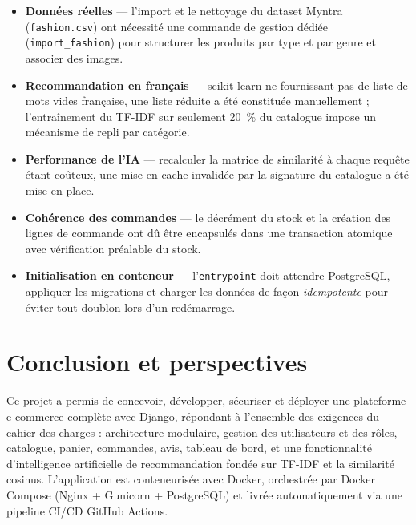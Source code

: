 \documentclass[11pt,a4paper]{report}
\begin{document}
\begin{itemize}[leftmargin=1.4em]
  \item \textbf{Données réelles} — l'import et le nettoyage du dataset Myntra
        (\texttt{fashion.csv}) ont nécessité une commande de gestion dédiée
        (\texttt{import\_fashion}) pour structurer les produits par type et par
        genre et associer des images.
  \item \textbf{Recommandation en français} — scikit-learn ne fournissant pas de
        liste de mots vides française, une liste réduite a été constituée
        manuellement ; l'entraînement du TF-IDF sur seulement 20~\% du catalogue
        impose un mécanisme de repli par catégorie.
  \item \textbf{Performance de l'IA} — recalculer la matrice de similarité à chaque
        requête étant coûteux, une mise en cache invalidée par la signature du
        catalogue a été mise en place.
  \item \textbf{Cohérence des commandes} — le décrément du stock et la création des
        lignes de commande ont dû être encapsulés dans une transaction atomique
        avec vérification préalable du stock.
  \item \textbf{Initialisation en conteneur} — l'\texttt{entrypoint} doit attendre
        PostgreSQL, appliquer les migrations et charger les données de façon
        \emph{idempotente} pour éviter tout doublon lors d'un redémarrage.
\end{itemize}

\chapter{Conclusion et perspectives}

Ce projet a permis de concevoir, développer, sécuriser et déployer une plateforme
e-commerce complète avec Django, répondant à l'ensemble des exigences du cahier des
charges : architecture modulaire, gestion des utilisateurs et des rôles, catalogue,
panier, commandes, avis, tableau de bord, et une fonctionnalité d'intelligence
artificielle de recommandation fondée sur TF-IDF et la similarité cosinus.
L'application est conteneurisée avec Docker, orchestrée par Docker Compose
(Nginx + Gunicorn + PostgreSQL) et livrée automatiquement via une pipeline CI/CD
GitHub Actions.
\end{document}
